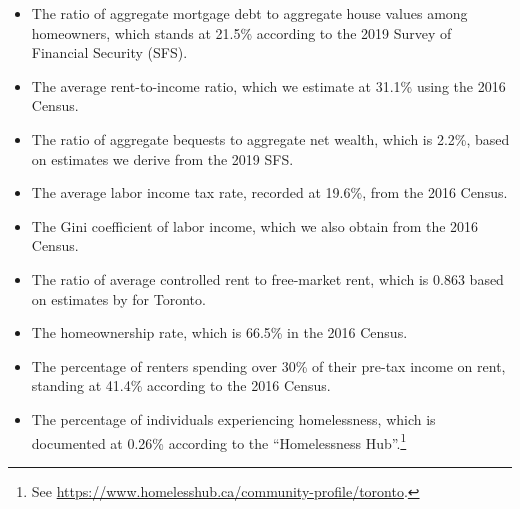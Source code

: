 \documentclass[parskip=full]{article}
\begin{document}
\begin{itemize}
    \item The ratio of aggregate mortgage debt to aggregate house values among homeowners, which stands at 21.5\% according to the 2019 Survey of Financial Security (SFS).
    \item The average rent-to-income ratio, which we estimate at 31.1\% using the 2016 Census.
    \item The ratio of aggregate bequests to aggregate net wealth, which is 2.2\%, based on estimates we derive from the 2019 SFS.
    \item The average labor income tax rate, recorded at 19.6\%, from the 2016 Census.
    \item The Gini coefficient of labor income, which we also obtain from the 2016 Census.
    \item The ratio of average controlled rent to free-market rent, which is 0.863 based on estimates by \citet{zhang-gou} for Toronto.
    \item The homeownership rate, which is 66.5\% in the 2016 Census.
    \item The percentage of renters spending over 30\% of their pre-tax income on rent, standing at 41.4\% according to the 2016 Census.
    \item The percentage of individuals experiencing homelessness, which is documented at 0.26\% according to the ``Homelessness Hub''.\footnote{See \url{https://www.homelesshub.ca/community-profile/toronto}.}
\end{itemize}
\end{document}
